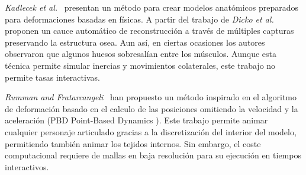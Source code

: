 \emph{Kadlecek et al.}~\cite{kadlecek-16-reconstructing} presentan un método para crear modelos anatómicos preparados para deformaciones basadas en físicas. A partir del trabajo de \emph{Dicko et al.}\cite{Ali2013} proponen un cauce automático de reconstrucción a través de múltiples capturas preservando la estructura osea. Aun así, en ciertas ocasiones los autores observaron que algunos huesos sobresalían entre los músculos. Aunque esta técnica permite simular inercias y movimientos colaterales, este trabajo no permite tasas interactivas.   %

\emph{Rumman and Fratarcangeli}~\cite{abu2015position} han propuesto un método inspirado en el algoritmo de deformación basado en el calculo de las posiciones omitiendo la velocidad y la aceleración (PBD Point-Based Dynamics \cite{Bender:2014}). Este trabajo permite animar cualquier personaje articulado gracias a la discretización del interior del modelo, permitiendo también animar los tejidos internos. Sin embargo, el coste computacional requiere de mallas en baja resolución para su ejecución en tiempos interactivos.

